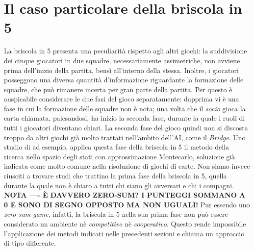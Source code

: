 \section{Il caso particolare della briscola in 5}

La briscola in 5 presenta una peculiarità rispetto agli altri giochi: la suddivisione dei cinque giocatori in due squadre, necessariamente assimetriche, non avviene prima dell'inizio della partita, bensì all'interno della stessa.
Inoltre, i giocatori posseggono una diversa quantità d'informazione riguardante la formazione delle squadre, che può rimanere incerta per gran parte della partita.
Per questo è auspicabile considerare le due fasi del gioco separatamente: dapprima vi è una fase in cui la formazione delle squadre non è nota; una volta che il \emph{socio} gioca la carta chiamata, palesandosi, ha inizio la seconda fase, durante la quale i ruoli di tutti i giocatori diventano chiari.
La seconda fase del gioco quindi non si discosta troppo da altri giochi già molto trattati nell'ambito dell'AI, come il \emph{Bridge}.
Uno studio di \cite{villa} ad esempio, applica questa fase della briscola in 5 il metodo della ricerca nello spazio degli stati con approssimazione Montecarlo, soluzione già indicata come molto comune nella risoluzione di giochi di carte.
Non siamo invece riusciti a trovare studi che trattino la prima fase della briscola in 5, quella durante la quale non è chiaro a tutti chi siano gli avversari e chi i compagni.
\textbf{NOTA ---- È DAVVERO ZERO-SUM? I PUNTEGGI SOMMANO A 0 E SONO DI SEGNO OPPOSTO MA NON UGUALI!}
Pur essendo uno \emph{zero-sum game}, infatti, la briscola in 5 nella sua prima fase non può essere considerato un ambiente nè \emph{competitivo} nè \emph{cooperativo}.
Questo rende impossibile l'applicazione dei metodi indicati nelle precedenti sezioni e chiama un approccio di tipo differente.

